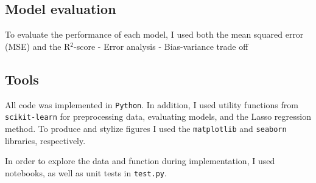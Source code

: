 \subsection{Model evaluation}\label{ssec:evaluation}
To evaluate the performance of each model, I used both the mean squared error (MSE) and the R$^{2}$-score
- Error analysis
- Bias-variance trade off

\subsection{Tools}\label{ssec:tools}
All code was implemented in \verb|Python|. In addition, I used utility functions from \verb|scikit-learn| for preprocessing data, evaluating models, and the Lasso regression method. To produce and stylize figures I used the \verb|matplotlib| and \verb|seaborn| libraries, respectively.

In order to explore the data and function during implementation, I used notebooks, as well as unit tests in \verb|test.py|.